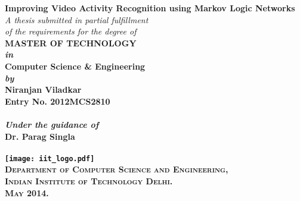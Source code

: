 \begin{titlepage}
\begin{center}

\LARGE{\bfseries Improving Video Activity Recognition using Markov Logic Networks}\\
\vspace{20pt}
\normalsize
\emph{A thesis submitted in partial fulfillment} \\
\emph{of the requirements for the degree of} \\
\vspace{20pt}
\bfseries MASTER OF TECHNOLOGY \\
\vspace{20pt}
\emph {in}\\
\vspace{20pt}
\bfseries Computer Science \& Engineering \\
\vspace{20pt}
\emph {by}\\
\vspace{20pt}
\Large{\bfseries Niranjan Viladkar} \\
{\normalsize {\bfseries Entry No. 2012MCS2810}}\\
\ \\
{\normalsize \emph {Under the guidance of}}
\ \\
\Large{\bfseries Dr. Parag Singla} \\
\ \\
\vspace{30pt}
\texttt{[image: iit\_logo.pdf]} \\
\vspace{10pt}
\large{\textsc{Department of Computer Science and Engineering,\\
Indian Institute of Technology Delhi.\\ May 2014.}}
\end{center}
\end{titlepage}
